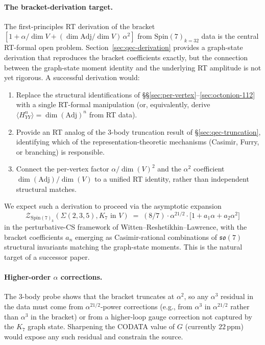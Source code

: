 \documentclass[11pt]{article}
\newcommand{\so}{\mathfrak{so}}
\newcommand{\Spin}{\mathrm{Spin}}
\newcommand{\Adj}{\mathrm{Adj}}
\begin{document}
\paragraph{The bracket-derivation target.}
The first-principles RT derivation of the bracket
$[1 + \alpha/\dim V + (\dim\Adj/\dim V)\,\alpha^2]$
from $\Spin(7)_{k=32}$ data is the central RT-formal open problem.
Section~\ref{sec:qec-derivation} provides a graph-state derivation
that reproduces the bracket coefficients exactly, but the connection
between the graph-state moment identity and the underlying RT
amplitude is not yet rigorous.  A successful derivation would:
\begin{enumerate}
\item Replace the structural identifications of
  \S\S\ref{sec:per-vertex}--\ref{sec:octonion-112} with a single
  RT-formal manipulation (or, equivalently, derive
  $\langle H_{YY}^n\rangle = \dim(\Adj)^n$ from RT data).
\item Provide an RT analog of the 3-body truncation result of
  \S\ref{sec:qec-truncation}, identifying which of the
  representation-theoretic mechanisms (Casimir, Furry, or
  branching) is responsible.
\item Connect the per-vertex factor $\alpha/\dim(V)^2$ and the
  $\alpha^2$ coefficient $\dim(\Adj)/\dim(V)$ to a unified RT
  identity, rather than independent structural matches.
\end{enumerate}
We expect such a derivation to proceed via the asymptotic
expansion
\begin{equation}
  \mathcal{Z}_{\Spin(7)_k}(\Sigma(2,3,5), K_7 \text{ in } V)
  \;=\; (8/7) \cdot \alpha^{21/2} \cdot \bigl[1 + a_1 \alpha + a_2 \alpha^2\bigr]
\end{equation}
in the perturbative-CS framework of Witten--Reshetikhin--Lawrence,
with the bracket coefficients $a_n$ emerging as Casimir-rational
combinations of $\so(7)$ structural invariants matching the
graph-state moments.  This is the natural target of a successor
paper.

\paragraph{Higher-order $\alpha$ corrections.}
The 3-body probe shows that the bracket truncates at $\alpha^2$,
so any $\alpha^3$ residual in the data must come from
$\alpha^{21/2}$-power corrections (e.g., from $\alpha^3$ in
$\alpha^{21/2}$ rather than $\alpha^3$ in the bracket) or from a
higher-loop gauge correction not captured by the $K_7$ graph state.
Sharpening the CODATA value of $G$ (currently $22\,\mathrm{ppm}$)
would expose any such residual and constrain the source.
\end{document}
